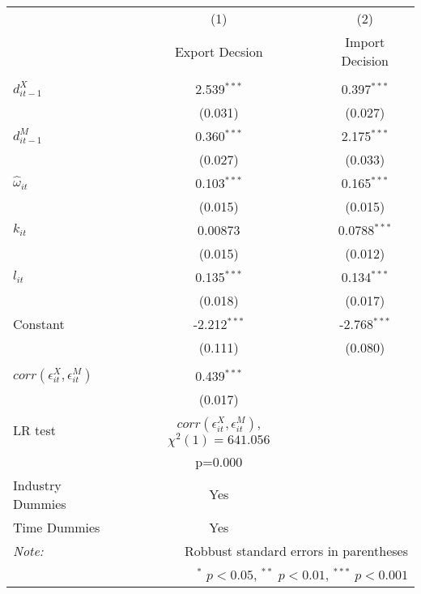 \begin{center}
\begin{tabular}{l*{2}{c}}
\hline\hline
            &\multicolumn{1}{c}{(1)}&\multicolumn{1}{c}{(2)}\\
            &\multicolumn{1}{c}{Export
              Decsion}&\multicolumn{1}{c}{Import Decision}\\
\hline\\

$d_{it-1}^{X}$  &          2.539$^{***}$    &   0.397$^{***}$ \\
            &        (0.031)             &(0.027)         \\
[1em]                                                        
$d_{it-1}^{M}$      &      0.360$^{***}$    &   2.175$^{***}$\\
            &          (0.027)             &(0.033)         \\
[1em]                                                        
$\hat{\omega}_{it}$  &     0.103$^{***}$     &  0.165$^{***}$\\
            &          (0.015)             &(0.015)         \\
[1em]                                                        
$k_{it}$       &        0.00873              & 0.0788$^{***}$\\
            &          (0.015)             &(0.012)         \\
[1em]                                                        
$l_{it}$     &            0.135$^{***}$     &  0.134$^{***}$\\
            &          (0.018)             &(0.017)         \\
[1em]                                                        
Constant      &          -2.212$^{***}$     & -2.768$^{***}$\\
            &           (0.111)             &(0.080)         \\
\hline
\\                                                               
$corr(\epsilon_{it}^{X},\epsilon_{it}^{M}) $      &       0.439$^{***}$\\
            &    (0.017)         \\
LR test& $corr(\epsilon_{it}^{X},\epsilon_{it}^{M})$, $\chi^{2}(1)= 641.056$&\\
& p=0.000&\\
Industry Dummies & Yes& \\
Time Dummies& Yes& \\
[1em]
\hline\hline

\textit{Note:}&\multicolumn{2}{r}{\footnotesize  Robbust standard errors in parentheses}\\
&\multicolumn{2}{r}{\footnotesize $^{*}$ \(p<0.05\), $^{**}$ \(p<0.01\), $^{***}$ \(p<0.001\)}\\
\end{tabular}
\end{center}
